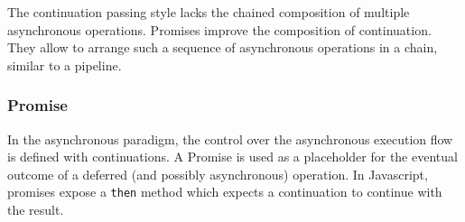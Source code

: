 The continuation passing style lacks the chained composition of multiple asynchronous operations.
Promises improve the composition of continuation.
They allow to arrange such a sequence of asynchronous operations in a chain, similar to a pipeline.


\subsubsection{Promise} \label{chapter4:event-loop:promise}



In the asynchronous paradigm, the control over the asynchronous execution flow is defined with continuations.
A Promise is used as a placeholder for the eventual outcome of a deferred (and possibly asynchronous) operation.
In Javascript, promises expose a \texttt{then} method which expects a continuation to continue with the result. %

